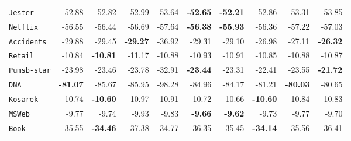 \documentclass[xcolor={usenames,dvipsnames,svgnames}, compress]{beamer}
\begin{document}
\begin{frame}[t]
\begin{table}[t]
\begin{tabular}{l r r r r  r | r r r r}
    \texttt{Jester}     & -52.88                               & -52.82                                & -52.99                 & -53.64  &\cellcolor{lacamlilac}\color{white} \textbf{-52.65}  &\cellcolor{lacamlilac}\color{white} \textbf{-52.21}  & -52.86         & -53.31          & -53.85          \\ 
    \texttt{Netflix}    & -56.55                               & -56.44                                & -56.69                 & -57.64  & \textbf{-56.38}  &\cellcolor{lacamlilac}\color{white} \textbf{-55.93}  & -56.36         & -57.22          & -57.03          \\ 
    \texttt{Accidents}  & -29.88                               & -29.45                                & \textbf{-29.27}                 & -36.92  & -29.31  & -29.10           & -26.98         & -27.11          & \textbf{-26.32} \\ 
    \texttt{Retail}     & -10.84                               & \textbf{-10.81}                                & -11.17                 & -10.88  & -10.93  & -10.91           & -10.85         & -10.88          & -10.87          \\ 
    \texttt{Pumsb-star} & -23.98                               & -23.46                                & -23.78                 & -32.91  & \textbf{-23.44}  & -23.31           & -22.41         & -23.55          & \textbf{-21.72} \\ 
    \texttt{DNA}        &\textbf{-81.07}                               & -85.67                                & -85.95                 & -98.28  & -84.96  & -84.17           & -81.21         & \textbf{-80.03} & -80.65          \\ 
    \texttt{Kosarek}    & -10.74                               & \textbf{-10.60}                                & -10.97                 & -10.91  & -10.72  & -10.66           & \textbf{-10.60}         & -10.84          & -10.83          \\ 
    \texttt{MSWeb}      & -9.77                                & -9.74                                 & -9.93                  & -9.83   &\cellcolor{lacamlilac}\color{white} \textbf{-9.66}   &\cellcolor{lacamlilac}\color{white} \textbf{-9.62}   & -9.73          & -9.77           & -9.70           \\ 
    \texttt{Book}       & -35.55                               & \textbf{-34.46}                                & -37.38                 & -34.77  & -36.35  & -35.45           & \textbf{-34.14}         & -35.56          & -36.41          \\ 

\end{tabular}
\end{table}
\end{frame}
\end{document}
